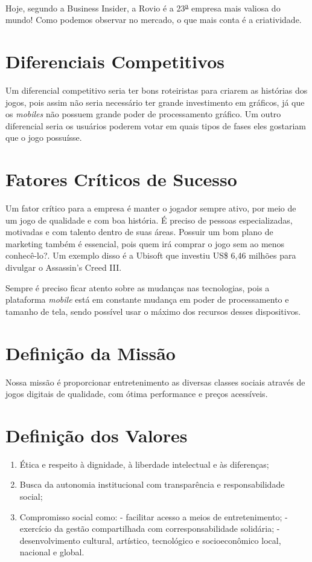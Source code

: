 \documentclass{abnt}
\begin{document}
		Hoje, segundo a Business Insider, a Rovio\textsuperscript{\texttrademark} é a  23\textsuperscript{\underline{a}} empresa mais valiosa do mundo!
	Como podemos observar no mercado, o que mais conta é a criatividade.

	\chapter {Diferenciais Competitivos}
		Um diferencial competitivo seria ter bons roteiristas para criarem as histórias dos jogos, pois assim não seria necessário ter grande investimento em gráficos, já que os \textit{mobiles} não possuem grande poder de processamento gráfico.
		Um outro diferencial seria os usuários poderem votar em quais tipos de fases eles gostariam que o jogo possuísse.
	\chapter {Fatores Críticos de Sucesso}
		Um fator crítico para a empresa é manter o jogador sempre ativo, por meio de um jogo de qualidade e com boa história.
		É preciso de pessoas especializadas, motivadas e com talento dentro de suas áreas.
		Possuir um bom plano de marketing também é essencial, pois quem irá comprar o jogo sem ao menos conhecê-lo?. Um exemplo disso é a Ubisoft\textsuperscript{\texttrademark} que investiu US\$ 6,46 milhões para divulgar o Assassin's Creed III.
	
		Sempre é preciso ficar atento sobre as mudanças nas tecnologias, pois a plataforma \textit{mobile} está em constante mudança em poder de processamento e tamanho de tela, sendo possível usar o máximo dos recursos desses dispositivos. 

	\chapter {Definição da Missão}
	
		Nossa missão é proporcionar entretenimento as diversas classes sociais através 
		de jogos digitais de qualidade, com ótima performance e preços acessíveis.
	
	\chapter {Definição dos Valores}
	
		\begin{enumerate}
			\item Ética e respeito à dignidade, à liberdade intelectual e às diferenças;
			\item Busca da autonomia institucional com transparência e responsabilidade social;
			\item Compromisso social como:
				\subitem - facilitar acesso a meios de entretenimento;
				\subitem - exercício da gestão compartilhada com corresponsabilidade solidária;
				\subitem - desenvolvimento cultural, artístico, tecnológico e socioeconômico local, nacional e global.
		\end{enumerate}
			
\end{document}
